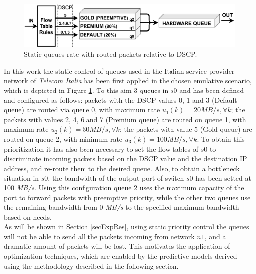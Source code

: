 \begin{figure}[tb!]
	\centering
	\includegraphics[keepaspectratio,width=\columnwidth]{figure/QUEUE.eps}
	\caption{Static queues rate with routed packets relative to DSCP.}
	\label{fig:{queue}}
\end{figure}

In this work the static control of queues used in the Italian service provider network of \textit{Telecom Italia} \cite{Notiziario} has been first applied in the chosen emulative scenario, which is depicted in Figure \ref{fig:{queue}}. To this aim 3 queues in $s0$ and has been defined and configured as follows: packets with the DSCP values 0, 1 and 3 (Default queue) are routed via queue 0, with maximum rate $u_1(k) = 20 \textit{MB/s}, \forall k$; the packets with values 2, 4, 6 and 7 (Premium queue) are routed on queue 1, with maximum rate $u_2(k) = 80 \textit{MB/s}, \forall k$; the packets with value 5 (Gold queue) are routed on queue 2, with minimum rate $u_3(k) = 100 \textit{MB/s}, \forall k$. To obtain this prioritization it has also been necessary to set the flow tables of $s0$ to discriminate incoming packets based on the DSCP value and the destination IP address, and re-route them to the desired queue. Also, to obtain a bottleneck situation in $s0$, the bandwidth of the output port of switch $s0$ has been setted at 100 \textit{MB/s}. Using this configuration queue 2 uses the maximum capacity of the port to forward packets with preemptive priority, while the other two queues use the remaining bandwidth from 0 \textit{MB/s} to the specified maximum bandwidth based on needs.\\
As will be shown in Section \ref{secExpRes}, using static priority control the queues will not be able to send all the packets incoming from network $n1$, and a dramatic amount of packets will be lost. This motivates the application of optimization techniques, which are enabled by the predictive models derived using the methodology described in the following section.
